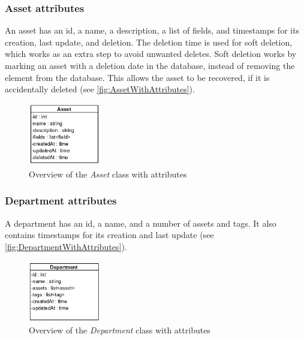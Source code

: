 \subsubsection{Asset attributes}
An asset has an id, a name, a description, a list of fields, and timestamps for its creation, last update, and deletion. The deletion time is used for soft deletion, which works as an extra step to avoid unwanted deletes. Soft deletion works by marking an asset with a deletion date in the database, instead of removing the element from the database. This allows the asset to be recovered, if it is accidentally deleted (see \autoref{fig:AssetWithAttributes}).

\begin{figure}[H]
    \centering
    \includegraphics[width=0.28\textwidth]{figures/Classes/AssetAttributes.png}
    \caption{Overview of the \textit{Asset} class with attributes}
    \label{fig:AssetWithAttributes}
\end{figure}

\subsubsection{Department attributes}
A department has an id, a name, and a number of assets and tags. It also contains timestamps for its creation and last update (see \autoref{fig:DepartmentWithAttributes}).
\begin{figure}[H]
    \centering
    \includegraphics[width=0.28\textwidth]{figures/Classes/DepartmentAttributes.png}
    \caption{Overview of the \textit{Department} class with attributes}
    \label{fig:DepartmentWithAttributes}
\end{figure}

